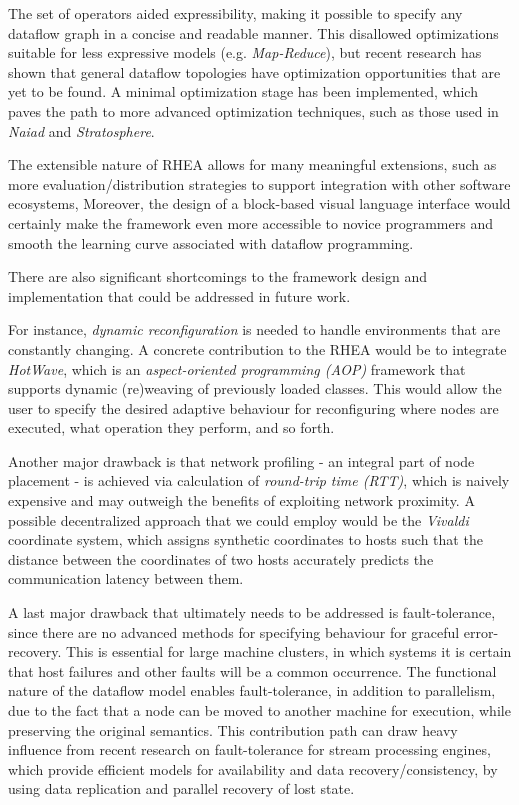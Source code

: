 \documentclass[sigplan,review,anonymous]{acmart}
\begin{document}
The set of operators aided expressibility, making it possible to specify any
dataflow graph in a concise and readable manner. This disallowed optimizations
suitable for less expressive models (e.g. \textit{Map-Reduce}), but recent
research has shown that general dataflow topologies have optimization
opportunities that are yet to be found\cite{blackbox}. A minimal optimization
stage has been implemented, which paves the path to more advanced optimization
techniques, such as those used in \textit{Naiad}\cite{naiad} and
\textit{Stratosphere}\cite{static_analysis}.

The extensible nature of \textsc{RHEA} allows for many meaningful extensions, such as
more evaluation/distribution strategies to support integration with other software ecosystems,
Moreover, the design of a block-based visual language interface would certainly make the
framework even more accessible to novice programmers and smooth the learning curve
associated with dataflow programming.

There are also significant shortcomings to the framework design and implementation that
could be addressed in future work.

For instance, \textit{dynamic reconfiguration} is needed to handle environments that are constantly changing.
A concrete contribution to the \textsc{RHEA} would be to integrate \textit{HotWave}\cite{reconf_java},
which is an \textit{aspect-oriented programming (AOP)} framework that supports dynamic
(re)weaving of previously loaded classes. This would allow the user to specify the desired
adaptive behaviour for reconfiguring where nodes are executed, what operation they perform, and so forth.

Another major drawback is that network profiling - an integral part of node placement - is achieved via
calculation of \textit{round-trip time (RTT)}, which is naively expensive and may outweigh the benefits of
exploiting network proximity. A possible decentralized approach that we could employ would be the \textit{Vivaldi}
coordinate system\cite{vivaldi}, which assigns synthetic coordinates to hosts
such that the distance between the coordinates of two hosts accurately predicts
the communication latency between them.

A last major drawback that ultimately needs to be addressed is fault-tolerance,
since there are no advanced methods for specifying behaviour for graceful
error-recovery. This is essential for large machine clusters, in which systems it is
certain that host failures and other faults will be a common occurrence. The
functional nature of the dataflow model enables fault-tolerance, in addition to
parallelism, due to the fact that a node can be moved to another machine for
execution, while preserving the original semantics.  This contribution path can draw
heavy influence from recent research on fault-tolerance for stream processing engines\cite{borealis,wide_area},
which provide efficient models for availability and data recovery/consistency,
by using data replication and parallel recovery of lost state.
\end{document}
